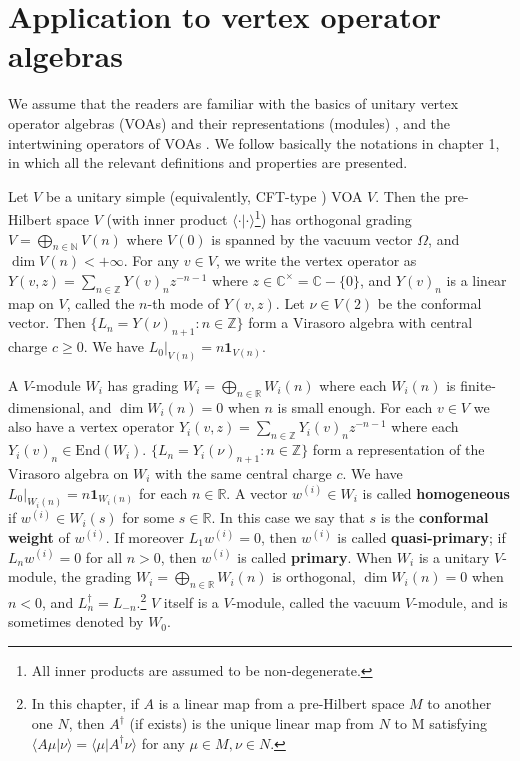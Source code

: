 \documentclass[11pt,b5paper,notitlepage]{article}
\theoremstyle{definition}
\theoremstyle{plain}
\newcommand{\End}{\mathrm{End}} %
\newcommand{\id}{\mathbf{1}}
\newcommand{\bk}[1]{\langle {#1}\rangle}
\newcommand{\mbb}{\mathbb}
\numberwithin{equation}{subsection}
\begin{document}
\section{Application to vertex operator algebras}



We assume that the readers are familiar with the basics of unitary vertex operator algebras (VOAs) and their representations (modules) \cite{CKLW18,DL14}, and the intertwining operators of VOAs \cite{FHL93}. We follow basically the notations in \cite{Gui19a} chapter 1, in which all the relevant definitions and properties are presented.

Let $V$ be a unitary simple (equivalently, CFT-type \cite{CKLW18}) VOA $V$. Then the pre-Hilbert space $V$ (with inner product $\bk{\cdot|\cdot}$\footnote{All inner products are assumed to be non-degenerate.}) has orthogonal grading $V=\bigoplus_{n\in\mbb N}V(n)$ where $V(0)$ is spanned by the vacuum vector $\Omega$, and $\dim V(n)<+\infty$. For any $v\in V$, we write the vertex operator as $Y(v,z)=\sum_{n\in\mbb Z}Y(v)_nz^{-n-1}$ where $z\in\mbb C^\times=\mbb C-\{0\}$, and $Y(v)_n$ is a linear map on $V$, called the $n$-th mode of $Y(v,z)$. Let $\nu\in V(2)$ be the conformal vector. Then $\{L_n=Y(\nu)_{n+1}:n\in\mbb Z\}$ form a Virasoro algebra with central charge $c\geq0$. We have $L_0|_{V(n)}=n\id_{V(n)}$.

A $V$-module $W_i$ has grading $W_i=\bigoplus_{n\in\mbb R}W_i(n)$ where each $W_i(n)$ is finite-dimensional, and $\dim W_i(n)=0$ when $n$ is small enough. For each $v\in V$ we also have a vertex operator $Y_i(v,z)=\sum_{n\in\mbb Z}Y_i(v)_nz^{-n-1}$ where each $Y_i(v)_n\in\End(W_i)$. $\{L_n=Y_i(\nu)_{n+1}:n\in\mbb Z\}$ form a representation of the Virasoro algebra on $W_i$ with the same central charge $c$. We have $L_0|_{W_i(n)}=n\id_{W_i(n)}$ for each $n\in\mbb R$. A vector $w^{(i)}\in W_i$ is called \textbf{homogeneous} if $w^{(i)}\in W_i(s)$ for some $s\in\mbb R$. In this case we say that $s$ is the \textbf{conformal weight} of $w^{(i)}$. If moreover $L_1w^{(i)}=0$, then $w^{(i)}$ is called \textbf{quasi-primary}; if $L_nw^{(i)}=0$ for all $n>0$, then $w^{(i)}$ is called \textbf{primary}. When $W_i$ is a unitary $V$-module, the grading $W_i=\bigoplus_{n\in\mbb R}W_i(n)$ is orthogonal, $\dim W_i(n)=0$ when $n<0$, and $L_n^\dagger=L_{-n}$.\footnote{In this chapter, if $A$ is a linear   map from a pre-Hilbert space $M$ to another one $N$, then $A^\dagger$ (if exists) is the unique linear  map from $N$ to M satisfying $\bk {A\mu|\nu}=\bk{\mu|A^\dagger\nu}$  for any $\mu\in M,\nu\in N$.} $V$ itself is a $V$-module, called the vacuum $V$-module, and is sometimes denoted by $W_0$.
\end{document}
